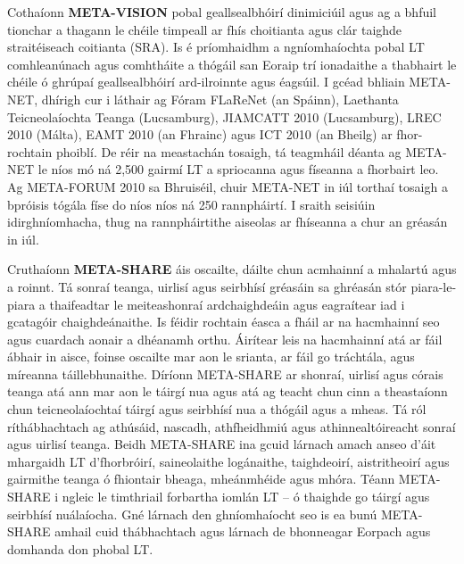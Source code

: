 \documentclass[]{../../metanetpaper}
\begin{document}
\begin{multicols}{2}
Cothaíonn \textbf{META-VISION} pobal geallsealbhóirí dinimiciúil agus ag a bhfuil tionchar a thagann le chéile timpeall ar fhís choitianta agus clár taighde straitéiseach coitianta (SRA). Is é príomhaidhm a ngníomhaíochta pobal LT comhleanúnach agus comhtháite a thógáil san Eoraip trí ionadaithe a thabhairt le chéile ó ghrúpaí geallsealbhóirí ard-ilroinnte agus éagsúil. I gcéad bhliain META-NET, dhírigh cur i láthair ag Fóram FLaReNet (an Spáinn), Laethanta Teicneolaíochta Teanga (Lucsamburg), JIAMCATT 2010 (Lucsamburg), LREC 2010 (Málta), EAMT 2010 (an Fhrainc) agus ICT 2010 (an Bheilg) ar fhor-rochtain phoiblí. De réir na meastachán tosaigh, tá teagmháil déanta ag META-NET le níos mó ná 2,500 gairmí LT a spriocanna agus físeanna a fhorbairt leo. Ag META-FORUM 2010 sa Bhruiséil, chuir META-NET in iúl torthaí tosaigh a bpróisis tógála físe do níos níos ná 250 rannpháirtí. I sraith seisiúin idirghníomhacha, thug na rannpháirtithe aiseolas ar fhíseanna a chur an gréasán in iúl.

Cruthaíonn \textbf{META-SHARE} áis oscailte, dáilte chun acmhainní a mhalartú agus a roinnt. Tá sonraí teanga, uirlisí agus seirbhísí gréasáin sa ghréasán stór piara-le-piara a thaifeadtar le meiteashonraí ardchaighdeáin agus eagraítear iad i gcatagóir chaighdeánaithe. Is féidir rochtain éasca a fháil ar na hacmhainní seo agus cuardach aonair a dhéanamh orthu. Áirítear leis na hacmhainní atá ar fáil ábhair in aisce, foinse oscailte mar aon le srianta, ar fáil go tráchtála, agus míreanna táillebhunaithe. Díríonn META-SHARE ar shonraí, uirlisí agus córais teanga atá ann mar aon le táirgí nua agus atá ag teacht chun cinn a theastaíonn chun teicneolaíochtaí táirgí agus seirbhísí nua a thógáil agus a mheas. Tá ról ríthábhachtach ag athúsáid, nascadh, athfheidhmiú agus athinnealtóireacht sonraí agus uirlisí teanga. Beidh META-SHARE ina gcuid lárnach amach anseo d’áit mhargaidh LT d’fhorbróirí, saineolaithe logánaithe, taighdeoirí, aistritheoirí agus gairmithe teanga ó fhiontair bheaga, mheánmhéide agus mhóra. Téann META-SHARE i ngleic le timthriail forbartha iomlán LT – ó thaighde go táirgí agus seirbhísí nuálaíocha. Gné lárnach den ghníomhaíocht seo is ea bunú META-SHARE amhail cuid thábhachtach agus lárnach de bhonneagar Eorpach agus domhanda don phobal LT.


\end{multicols}
\end{document}
